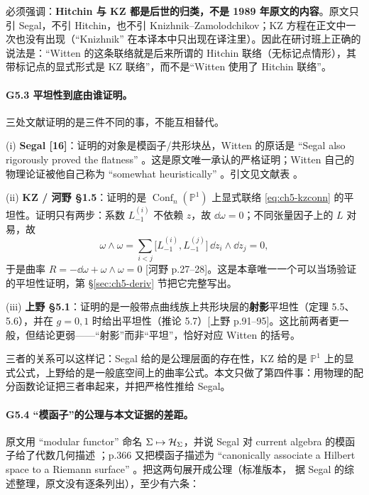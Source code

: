必须强调：\textbf{Hitchin 与 KZ 都是后世的归类，不是 1989 年原文的内容}。原文只引 Segal，不引 Hitchin，也不引 Knizhnik--Zamolodchikov；KZ 方程在正文中一次也没有出现（“Knizhnik” 在本译本中只出现在译注里）。因此在研讨班上正确的说法是：“Witten 的这条联络就是后来所谓的 Hitchin 联络（无标记点情形），其带标记点的显式形式是 KZ 联络”，而不是“Witten 使用了 Hitchin 联络”。

\paragraph{G5.3 平坦性到底由谁证明。}三处文献证明的是三件不同的事，不能互相替代。

(i) \textbf{Segal [16]}：证明的对象是模函子/共形块丛，Witten 的原话是 “Segal also rigorously proved the flatness” 。这是原文唯一承认的严格证明；Witten 自己的物理论证被他自己称为 “somewhat heuristically” 。引文见文献表 \cite{segal1988}。

(ii) \textbf{KZ / 河野 \S1.5}：证明的是 $\operatorname{Conf}_n(\mathbb P^1)$ 上显式联络 \eqref{eq:ch5-kzconn} 的平坦性。证明只有两步：系数 $L^{(i)}_{-1}$ 不依赖 $z$，故 $\dd\omega=0$；不同张量因子上的 $L$ 对易，故
\[
\omega\wedge\omega=\sum_{i<j}\bigl[L^{(i)}_{-1},L^{(j)}_{-1}\bigr]\,\dd z_i\wedge \dd z_j=0 ,
\]
于是曲率 $R=-\dd\omega+\omega\wedge\omega=0$ [河野 p.27--28]。这是本章唯一一个可以当场验证的平坦性证明，第 \S\ref{sec:ch5-deriv} 节把它完整写出。

(iii) \textbf{上野 \S5.1}：证明的是一般带点曲线族上共形块层的\textbf{射影}平坦性（定理 5.5、5.6），并在 $g=0,1$ 时给出平坦性（推论 5.7）[上野 p.91--95]。这比前两者更一般，但结论更弱——“射影”而非“平坦”，恰好对应 Witten 的括号。

三者的关系可以这样记：Segal 给的是公理层面的存在性，KZ 给的是 $\mathbb P^1$ 上的显式公式，上野给的是一般底空间上的曲率公式。本文只做了第四件事：用物理的配分函数论证把三者串起来，并把严格性推给 Segal。

\paragraph{G5.4 “模函子”的公理与本文证据的差距。}原文用 “modular functor” 命名 $\Sigma\mapsto\mathcal{H}_\Sigma$，并说 Segal 对 current algebra 的模函子给了代数几何描述 ；p.366 又把模函子描述为 “canonically associate a Hilbert space to a Riemann surface” 。把这两句展开成公理（标准版本，\ours{} 据 Segal 的综述整理，原文没有逐条列出），至少有六条：

